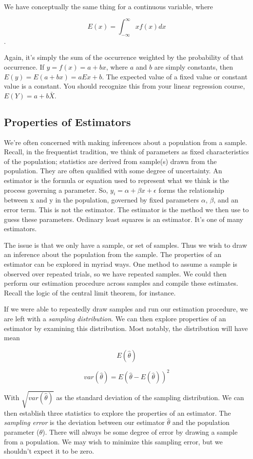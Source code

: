 \documentclass[
]{book}
\begin{document}
We have conceptually the same thing for a continuous variable, where

\[E(x)=\int_{-\infty}^{\infty}x f(x)dx\].

Again, it's simply the sum of the occurrence weighted by the probability of that occurrence. If \(y=f(x)=a+bx\), where \(a\) and \(b\) are simply constants, then \(E(y)=E(a+bx)=aEx+b\). The expected value of a fixed value or constant value is a constant. You should recognize this from your linear regression course, \(E(Y)=a+b\bar{X}\).

\subsection{Properties of Estimators}\label{properties-of-estimators}

We're often concerned with making inferences about a population from a sample. Recall, in the frequentist tradition, we think of parameters as fixed characteristics of the population; statistics are derived from sample(s) drawn from the population. They are often qualified with some degree of uncertainty. An estimator is the formula or equation used to represent what we think is the process governing a parameter. So, \(y_i=\alpha+\beta x + \epsilon\) forms the relationship between x and y in the population, governed by fixed parameters \(\alpha\), \(\beta\), and an error term. This is not the estimator. The estimator is the method we then use to guess these parameters. Ordinary least squares is an estimator. It's one of many estimators.

The issue is that we only have a sample, or set of samples. Thus we wish to draw an inference about the population from the sample. The properties of an estimator can be explored in myriad ways. One method to assume a sample is observed over repeated trials, so we have repeated samples. We could then perform our estimation procedure across samples and compile these estimates. Recall the logic of the central limit theorem, for instance.

If we were able to repeatedly draw samples and run our estimation procedure, we are left with a \textit{sampling distribution}. We can then explore properties of an estimator by examining this distribution. Most notably, the distribution will have mean

\[E(\hat {\theta})\]

\[var(\hat{\theta})=E(\hat{\theta}-E(\hat{\theta}))^2\]

With \(\sqrt{var(\hat{\theta})}\) as the standard deviation of the sampling distribution. We can then establish three statistics to explore the properties of an estimator. The \emph{sampling error} is the deviation between our estimator \(\hat{\theta}\) and the population parameter (\(\theta\)). There will always be some degree of error by drawing a sample from a population. We may wish to minimize this sampling error, but we shouldn't expect it to be zero.
\end{document}
